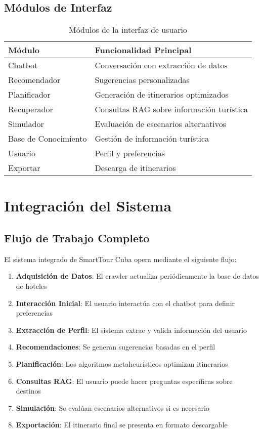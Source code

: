 \documentclass[runningheads]{llncs}
\begin{document}
\subsection{Módulos de Interfaz}

\begin{table}[H]
\centering
\begin{tabular}{ll}
\toprule
\textbf{Módulo} & \textbf{Funcionalidad Principal} \\
\midrule
Chatbot & Conversación con extracción de datos \\
Recomendador & Sugerencias personalizadas \\
Planificador & Generación de itinerarios optimizados \\
Recuperador & Consultas RAG sobre información turística \\
Simulador & Evaluación de escenarios alternativos \\
Base de Conocimiento & Gestión de información turística \\
Usuario & Perfil y preferencias \\
Exportar & Descarga de itinerarios \\
\bottomrule
\end{tabular}
\caption{Módulos de la interfaz de usuario}
\end{table}

\section{Integración del Sistema}

\subsection{Flujo de Trabajo Completo}

El sistema integrado de SmartTour Cuba opera mediante el siguiente flujo:

\begin{enumerate}
\item \textbf{Adquisición de Datos}: El crawler actualiza periódicamente la base de datos de hoteles
\item \textbf{Interacción Inicial}: El usuario interactúa con el chatbot para definir preferencias
\item \textbf{Extracción de Perfil}: El sistema extrae y valida información del usuario
\item \textbf{Recomendaciones}: Se generan sugerencias basadas en el perfil
\item \textbf{Planificación}: Los algoritmos metaheurísticos optimizan itinerarios
\item \textbf{Consultas RAG}: El usuario puede hacer preguntas específicas sobre destinos
\item \textbf{Simulación}: Se evalúan escenarios alternativos si es necesario
\item \textbf{Exportación}: El itinerario final se presenta en formato descargable
\end{enumerate}
\end{document}
